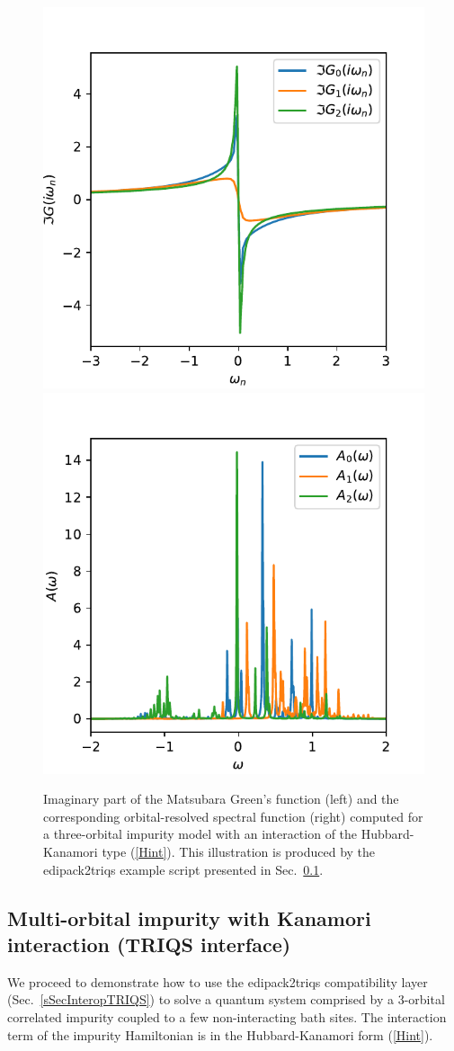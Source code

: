 \documentclass[edipack_sp.tex]{subfiles}
\begin{document}
\begin{figure}[t!]
    \includegraphics[width=0.5\linewidth]
        {edipack2_examples/edipack2triqs/G_iw.pdf}
    \includegraphics[width=0.5\linewidth]
        {edipack2_examples/edipack2triqs/A_w.pdf}
    \caption{\label{figEx3}%
        Imaginary part of the Matsubara Green's function (left) and the
        corresponding orbital-resolved spectral function (right) computed for a
        three-orbital impurity model with an interaction of the Hubbard-Kanamori
        type (\ref{Hint}). This illustration is produced by the edipack2triqs
        example script presented in Sec.~\ref{SecExamplesTRIQS}.
    }
\end{figure}

\subsection{Multi-orbital impurity with Kanamori
  interaction (TRIQS interface)}
\label{SecExamplesTRIQS}

We proceed to demonstrate how to use the edipack2triqs compatibility
layer (Sec.~\ref{sSecInteropTRIQS}) to solve a quantum system comprised by a
3-orbital correlated impurity coupled to a few non-interacting bath sites.
The interaction term of the impurity Hamiltonian is in the Hubbard-Kanamori
form (\ref{Hint}).
\end{document}

